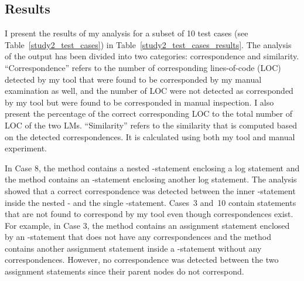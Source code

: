 
\subsection{Results}  \label{study2-results}
I present the results of my analysis for a subset of 10 test cases (see Table~\ref{study2_test_cases}) in Table~\ref{study2_test_cases_results}. The analysis of the output has been divided into two categories: correspondence and similarity. ``Correspondence'' refers to the number of corresponding lines-of-code (LOC) detected by my tool that were found to be corresponded by my manual examination as well, and the number of LOC were not detected as corresponded by my tool but were found to be corresponded in manual inspection. I also present the percentage of the correct corresponding LOC to the total number of LOC of the two LMs. ``Similarity'' refers to the similarity that is computed based on the detected correspondences. It is calculated using both my tool and manual experiment.


In Case 8, the  method contains a nested -statement enclosing a log statement and the  method contains an -statement enclosing another log statement. The analysis showed that a correct correspondence was detected between the inner -statement inside the nested - and the single -statement. Cases~3 and~10 contain statements that are not found to correspond by my tool even though correspondences exist. For example, in Case 3, the  method contains an assignment statement enclosed by an -statement that does not have any correspondences and the  method contains another assignment statement inside a -statement without any correspondences. However, no correspondence was detected between the two assignment statements since their parent nodes do not correspond.

